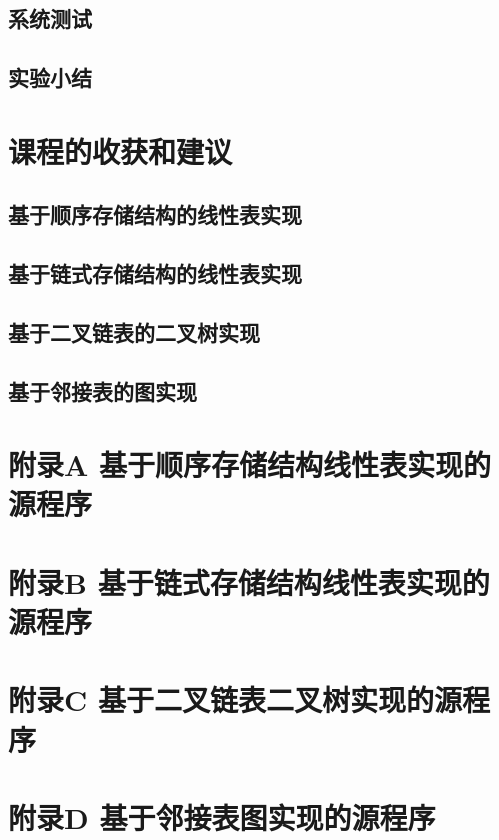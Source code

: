 \documentclass[supercite]{Experimental_Report}
\theoremstyle{definition}
\begin{document}
\subsection{系统测试}

\subsection{实验小结}

\newpage

\section{课程的收获和建议}



\subsection{基于顺序存储结构的线性表实现}



\subsection{基于链式存储结构的线性表实现}



\subsection{基于二叉链表的二叉树实现}



\subsection{基于邻接表的图实现}


\section{附录A 基于顺序存储结构线性表实现的源程序}
\section{附录B 基于链式存储结构线性表实现的源程序}
\section{附录C 基于二叉链表二叉树实现的源程序}
\section{附录D 基于邻接表图实现的源程序}
\end{document}
